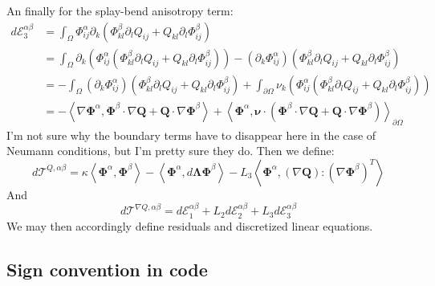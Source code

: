 \documentclass[reqno]{article}
\newcommand{\Q}{\mathbf{Q}}
\newcommand{\bLambda}{\boldsymbol{\Lambda}}
\newcommand{\bPhi}{\boldsymbol{\Phi}}
\begin{document}
An finally for the splay-bend anisotropy term:
\begin{equation}
\begin{split}
    d \mathcal E_3^{\alpha \beta}
    &=
    \int_\Omega \Phi^\alpha_{ij} \partial_k \left(
        \Phi^\beta_{kl} \partial_l Q_{ij}
        + Q_{kl} \partial_l \Phi^\beta_{ij}
    \right) \\
    &=
    \int_\Omega \partial_k \left( \Phi^\alpha_{ij} \left(
        \Phi^\beta_{kl} \partial_l Q_{ij}
        + Q_{kl} \partial_l \Phi^\beta_{ij}
    \right)
    \right)
    -
    \left( \partial_k \Phi^\alpha_{ij} \right) \left(
        \Phi^\beta_{kl} \partial_l Q_{ij}
        + Q_{kl} \partial_l \Phi^\beta_{ij}
    \right) \\
    &=
    -
    \int_\Omega \left( \partial_k \Phi^\alpha_{ij} \right) \left(
        \Phi^\beta_{kl} \partial_l Q_{ij}
        + Q_{kl} \partial_l \Phi^\beta_{ij}
    \right)
    + \int_{\partial \Omega} \nu_k \left( \Phi^\alpha_{ij} \left(
        \Phi^\beta_{kl} \partial_l Q_{ij}
        + Q_{kl} \partial_l \Phi^\beta_{ij}
    \right)
    \right) \\
    &=
    -\left< 
        \nabla \boldsymbol \Phi^\alpha, 
        \boldsymbol \Phi^\beta \cdot \nabla \Q + \Q \cdot \nabla \boldsymbol \Phi^\beta
    \right>
    +
    \left<
        \boldsymbol \Phi^\alpha, 
        \boldsymbol \nu \cdot \left(\boldsymbol \Phi^\beta \cdot \nabla \Q + \Q \cdot \nabla \boldsymbol \Phi^\beta \right)
    \right>_{\partial \Omega}
\end{split}
\end{equation}
I'm not sure why the boundary terms have to disappear here in the case of Neumann conditions, but I'm pretty sure they do.
Then we define:
\begin{equation}
    d\mathcal T^{Q, \alpha \beta}
    =
    \kappa \left< \bPhi^\alpha, \bPhi^\beta \right>
    - \left< \bPhi^\alpha, d\bLambda \bPhi^\beta \right>
    - L_3 \left< \bPhi^\alpha, \left(\nabla \Q\right) : \left( \nabla \bPhi^\beta \right)^T \right>
\end{equation}
And
\begin{equation}
    d\mathcal T^{\nabla Q, \alpha \beta}
    =
    d \mathcal E^{\alpha \beta}_1
    +
    L_2 d \mathcal E^{\alpha \beta}_2
    +
    L_3 d \mathcal E^{\alpha \beta}_3
\end{equation}
We may then accordingly define residuals and discretized linear equations.

\subsection{Sign convention in code}
\end{document}

